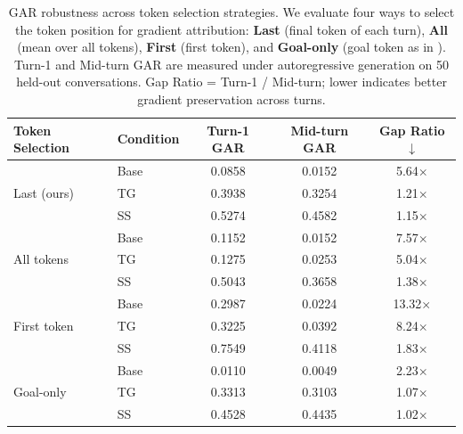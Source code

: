 \begin{table}[t]
\centering
\small
\caption{GAR robustness across token selection strategies. We evaluate four ways to select the token position for gradient attribution: \textbf{Last} (final token of each turn), \textbf{All} (mean over all tokens), \textbf{First} (first token), and \textbf{Goal-only} (goal token as in \citet{dongre2024multi}). Turn-1 and Mid-turn GAR are measured under autoregressive generation on 50 held-out conversations. Gap Ratio = Turn-1 / Mid-turn; lower indicates better gradient preservation across turns.}
\label{tab:gar_robustness}
\begin{tabular}{@{}ll ccc@{}}
\toprule
\textbf{Token Selection} & \textbf{Condition} & \textbf{Turn-1 GAR} & \textbf{Mid-turn GAR} & \textbf{Gap Ratio} $\downarrow$ \\
\midrule
\multirow{3}{*}{Last (ours)}
  & Base      & 0.0858 & 0.0152 & 5.64$\times$ \\
  & TG        & 0.3938 & 0.3254 & 1.21$\times$ \\
  & SS        & 0.5274 & 0.4582 & 1.15$\times$ \\
\midrule
\multirow{3}{*}{All tokens}
  & Base      & 0.1152 & 0.0152 & 7.57$\times$ \\
  & TG        & 0.1275 & 0.0253 & 5.04$\times$ \\
  & SS        & 0.5043 & 0.3658 & 1.38$\times$ \\
\midrule
\multirow{3}{*}{First token}
  & Base      & 0.2987 & 0.0224 & 13.32$\times$ \\
  & TG        & 0.3225 & 0.0392 & 8.24$\times$ \\
  & SS        & 0.7549 & 0.4118 & 1.83$\times$ \\
\midrule
\multirow{3}{*}{Goal-only}
  & Base      & 0.0110 & 0.0049 & 2.23$\times$ \\
  & TG        & 0.3313 & 0.3103 & 1.07$\times$ \\
  & SS        & 0.4528 & 0.4435 & 1.02$\times$ \\
\bottomrule
\end{tabular}
\end{table}
